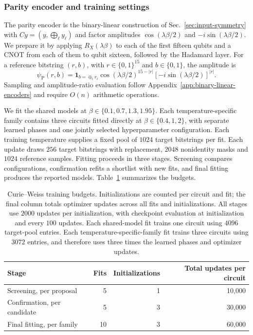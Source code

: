 \documentclass[pra,aps,10pt,twocolumn,floatfix,superscriptaddress, notitlepage,longbibliography]{revtex4-2}
\begin{document}
\subsubsection{Parity encoder and training settings}

The parity encoder is the binary-linear construction of Sec.~\ref{sec:input-symmetry} with $Cy=(y,\bigoplus_\ell y_\ell)$ and factor amplitudes $\cos(\lambda\beta/2)$ and $-i\sin(\lambda\beta/2)$. We prepare it by applying $R_X(\lambda\beta)$ to each of the first fifteen qubits and a CNOT from each of them to qubit sixteen, followed by the Hadamard layer. For a reference bitstring $(r,b)$, with $r\in\{0,1\}^{15}$ and $b\in\{0,1\}$, the amplitude is
\begin{equation}
 \psi_{\mathrm P}(r,b)=
 \mathbf{1}_{b=\oplus_i r_i}
 \cos(\lambda\beta/2)^{15-|r|}
 [-i\sin(\lambda\beta/2)]^{|r|}.
\end{equation}
Sampling and amplitude-ratio evaluation follow Appendix~\ref{app:binary-linear-encoders} and require $O(n)$ arithmetic operations.

We fit the shared models at $\beta\in\{0.1,0.7,1.3,1.95\}$. Each temperature-specific family contains three circuits fitted directly at $\beta\in\{0.4,1,2\}$, with separate learned phases and one jointly selected hyperparameter configuration. Each training temperature supplies a fixed pool of $1024$ target bitstrings per fit. Each update draws $256$ target bitstrings with replacement, $2048$ nonidentity masks and $1024$ reference samples. Fitting proceeds in three stages. Screening compares configurations, confirmation refits a shortlist with new fits, and final fitting produces the reported models. Table~\ref{tab:cw_baseline_budgets} summarizes the budgets.

\begin{table}[!htbp]
\centering
\caption{Curie--Weiss training budgets. Initializations are counted per circuit and fit; the final column totals optimizer updates across all fits and initializations. All stages use $2000$ updates per initialization, with checkpoint evaluation at initialization and every $100$ updates. Each shared-model fit trains one circuit using $4096$ target-pool entries. Each temperature-specific-family fit trains three circuits using $3072$ entries, and therefore uses three times the learned phases and optimizer updates.}
\label{tab:cw_baseline_budgets}
\small
\begin{tabular}{lrrr}
\toprule
Stage & Fits & Initializations & Total updates per circuit \\
\midrule
Screening, per proposal & 5 & 1 & 10,000 \\
Confirmation, per candidate & 5 & 3 & 30,000 \\
Final fitting, per family & 10 & 3 & 60,000 \\
\bottomrule
\end{tabular}
\end{table}
\end{document}
